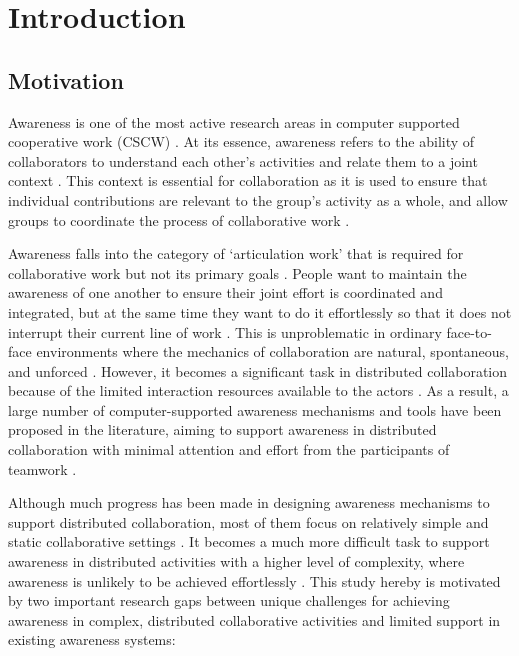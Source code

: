 \graphicspath{{Figures/}}

\chapter{Introduction} 
\label{chapter1:introduction}

\section{Motivation} %
\label{sec:motivation}
Awareness is one of the most active research areas in computer supported cooperative work (CSCW) \cite{dourish1992awareness,schmidt2002a,rittenbruch2009a}. At its essence, awareness refers to the ability of collaborators to understand each other's activities and relate them to a joint context \cite{rittenbruch2009a}. This context is essential for collaboration as it is used to ensure that individual contributions are relevant to the group's activity as a whole, and allow groups to coordinate the process of collaborative work \cite{dourish1992awareness}. 

Awareness falls into the category of `articulation work' that is required for collaborative work but not its primary goals \cite{schmidt1992taking}. People want to maintain the awareness of one another to ensure their joint effort is coordinated and integrated, but at the same time they want to do it effortlessly so that it does not interrupt their current line of work \cite{fussell1998coordination}. This is unproblematic in ordinary face-to-face environments where the mechanics of collaboration are natural, spontaneous, and unforced \cite{Gutwin2002}. However, it becomes a significant task in distributed collaboration because of the limited interaction resources available to the actors \cite{carroll2003a}. As a result, a large number of computer-supported awareness mechanisms and tools have been proposed in the literature, aiming to support awareness in distributed collaboration with minimal attention and effort from the participants of teamwork \cite{rittenbruch2009a,markopoulos2009design}.

Although much progress has been made in designing awareness mechanisms to support distributed collaboration, most of them focus on relatively simple and static collaborative settings \cite{antunes2010a}. It becomes a much more difficult task to support awareness in distributed activities with a higher level of complexity, where awareness is unlikely to be achieved effortlessly \cite{cabitza2009promoting}. This study hereby is motivated by two important research gaps between unique challenges for achieving awareness in complex, distributed collaborative activities and limited support in existing awareness systems:

